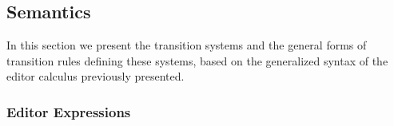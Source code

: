 \documentclass[sigplan,anonymous,review]{acmart}
\begin{document}

\subsection{Semantics}
In this section we present the transition systems and the general forms of transition rules defining these systems, based on the generalized syntax of the editor calculus previously presented. 

\subsubsection{Editor Expressions} \label{sec:Semantics}
\end{document}
